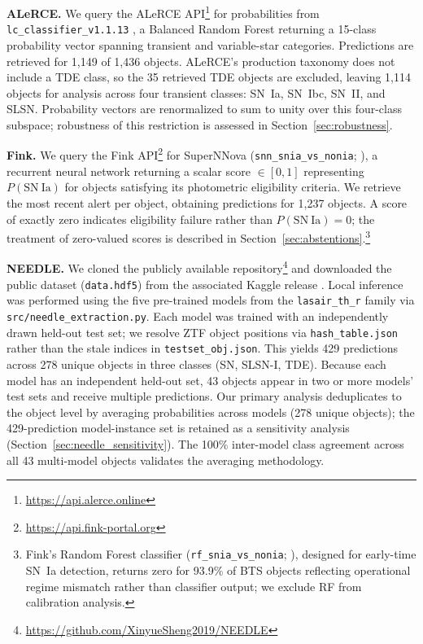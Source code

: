 \documentclass[a4paper,fleqn,usenatbib]{mnras}
\begin{document}
\textbf{ALeRCE.} We query the ALeRCE
API\footnote{\url{https://api.alerce.online}} for probabilities
from \texttt{lc\_classifier\_v1.1.13} \citep{sanchezsaez2021},
a Balanced Random Forest returning a 15-class probability vector
spanning transient and variable-star categories. Predictions are
retrieved for 1,149 of 1,436 objects. ALeRCE's production taxonomy
does not include a TDE class, so the 35 retrieved TDE objects are
excluded, leaving 1,114 objects for analysis across four transient
classes: SN~Ia, SN~Ibc, SN~II, and SLSN. Probability vectors are
renormalized to sum to unity over this four-class subspace;
robustness of this restriction is assessed in
Section~\ref{sec:robustness}.

\textbf{Fink.} We query the Fink
API\footnote{\url{https://api.fink-portal.org}} for SuperNNova
(\texttt{snn\_snia\_vs\_nonia}; \citealt{moller2020}), a recurrent
neural network returning a scalar score $\in [0,1]$ representing
$P(\mathrm{SN~Ia})$ for objects satisfying its photometric
eligibility criteria. We retrieve the most recent alert per object,
obtaining predictions for 1,237 objects. A score of exactly zero
indicates eligibility failure rather than $P(\mathrm{SN~Ia}) = 0$;
the treatment of zero-valued scores is described in
Section~\ref{sec:abstentions}.\footnote{Fink's Random Forest
classifier (\texttt{rf\_snia\_vs\_nonia}; \citealt{leoni2022}),
designed for early-time SN~Ia detection, returns zero for 93.9\%
of BTS objects reflecting operational regime mismatch rather than
classifier output; we exclude RF from calibration analysis.}

\textbf{NEEDLE.} We cloned the publicly available
repository\footnote{\url{https://github.com/XinyueSheng2019/NEEDLE}}
and downloaded the public dataset (\texttt{data.hdf5}) from the
associated Kaggle release \citep{sheng2024}. Local inference was
performed using the five pre-trained models from the
\texttt{lasair\_th\_r} family via \texttt{src/needle\_extraction.py}.
Each model was trained with an independently drawn held-out test
set; we resolve ZTF object positions via \texttt{hash\_table.json}
rather than the stale indices in \texttt{testset\_obj.json}. This
yields 429 predictions across 278 unique objects in three classes
(SN, SLSN-I, TDE). Because each model has an independent held-out
set, 43 objects appear in two or more models' test sets and receive
multiple predictions. Our primary analysis deduplicates to the
object level by averaging probabilities across models (278 unique
objects); the 429-prediction model-instance set is retained as a
sensitivity analysis (Section~\ref{sec:needle_sensitivity}). The
100\% inter-model class agreement across all 43 multi-model objects
validates the averaging methodology.
\end{document}
